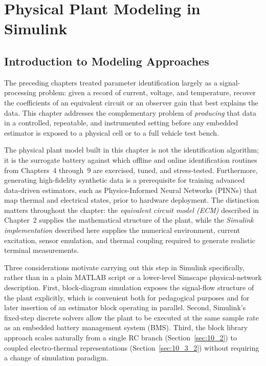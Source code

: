 
\chapter{Physical Plant Modeling in Simulink}
\label{ch:simulink_plant}

\section{Introduction to Modeling Approaches}
\label{sec:10_intro}

The preceding chapters treated parameter identification largely as a signal-processing problem: given a record of current, voltage, and temperature, recover the coefficients of an equivalent circuit or an observer gain that best explains the data. This chapter addresses the complementary problem of \emph{producing} that data in a controlled, repeatable, and instrumented setting before any embedded estimator is exposed to a physical cell or to a full vehicle test bench. 

The physical plant model built in this chapter is not the identification algorithm; it is the surrogate battery against which offline and online identification routines from Chapters~4 through~9 are exercised, tuned, and stress-tested. Furthermore, generating high-fidelity synthetic data is a prerequisite for training advanced data-driven estimators, such as Physics-Informed Neural Networks (PINNs) that map thermal and electrical states, prior to hardware deployment. The distinction matters throughout the chapter: the \emph{equivalent circuit model (ECM)} described in Chapter~2 supplies the mathematical structure of the plant, while the \emph{Simulink implementation} described here supplies the numerical environment, current excitation, sensor emulation, and thermal coupling required to generate realistic terminal measurements.

Three considerations motivate carrying out this step in Simulink specifically, rather than in a plain MATLAB script or a lower-level Simscape physical-network description. First, block-diagram simulation exposes the signal-flow structure of the plant explicitly, which is convenient both for pedagogical purposes and for later insertion of an estimator block operating in parallel. Second, Simulink's fixed-step discrete solvers allow the plant to be executed at the same sample rate as an embedded battery management system (BMS). Third, the block library approach scales naturally from a single RC branch (Section~\ref{sec:10_2}) to coupled electro-thermal representations (Section~\ref{sec:10_3_2}) without requiring a change of simulation paradigm.

